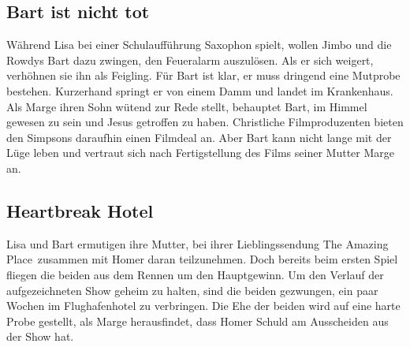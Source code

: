 \subsection{Bart ist nicht tot}\label{XABF19}
Während Lisa bei einer Schulaufführung Saxophon spielt, wollen Jimbo und die Rowdys Bart dazu zwingen, den Feueralarm auszulösen. Als er sich weigert, verhöhnen sie ihn als Feigling. Für Bart ist klar, er muss dringend eine Mutprobe bestehen. Kurzerhand springt er von einem Damm und landet im Krankenhaus. Als Marge ihren Sohn wütend zur Rede stellt, behauptet Bart, im Himmel gewesen zu sein und Jesus getroffen zu haben. Christliche Filmproduzenten bieten den Simpsons daraufhin einen Filmdeal an. Aber Bart kann nicht lange mit der Lüge leben und vertraut sich nach Fertigstellung des Films seiner Mutter Marge an.


\subsection{Heartbreak Hotel}
Lisa und Bart ermutigen ihre Mutter, bei ihrer Lieblingssendung \glqq The Amazing Place\grqq\ zusammen mit Homer daran teilzunehmen. Doch bereits beim ersten Spiel fliegen die beiden aus dem Rennen um den Hauptgewinn. Um den Verlauf der aufgezeichneten Show geheim zu halten, sind die beiden gezwungen, ein paar Wochen im Flughafenhotel zu verbringen. Die Ehe der beiden wird auf eine harte Probe gestellt, als Marge herausfindet, dass Homer Schuld am Ausscheiden aus der Show hat.


